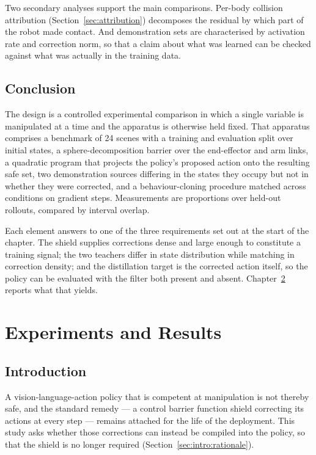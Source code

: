 \documentclass[a4paper,11pt]{report}
\begin{document}
Two secondary analyses support the main comparisons. Per-body collision attribution
(Section~\ref{sec:attribution}) decomposes the residual by which part of the robot made contact.
And demonstration sets are characterised by activation rate and correction norm, so that a claim
about what was learned can be checked against what was actually in the training data.

\section{Conclusion}\label{sec:method:conclusion}

The design is a controlled experimental comparison in which a single variable is manipulated at a
time and the apparatus is otherwise held fixed. That apparatus comprises a benchmark of 24 scenes
with a training and evaluation split over initial states, a sphere-decomposition barrier over the
end-effector and arm links, a quadratic program that projects the policy's proposed action onto the
resulting safe set, two demonstration sources differing in the states they occupy but not in
whether they were corrected, and a behaviour-cloning procedure matched across conditions on
gradient steps. Measurements are proportions over held-out rollouts, compared by interval overlap.

Each element answers to one of the three requirements set out at the start of the chapter. The
shield supplies corrections dense and large enough to constitute a training signal; the two
teachers differ in state distribution while matching in correction density; and the distillation
target is the corrected action itself, so the policy can be evaluated with the filter both present
and absent. Chapter~\ref{ch:results} reports what that yields.



\chapter{Experiments and Results}\label{ch:results}

\section{Introduction}\label{sec:res:intro}

A vision-language-action policy that is competent at manipulation is not thereby safe, and the
standard remedy --- a control barrier function shield correcting its actions at every step ---
remains attached for the life of the deployment. This study asks whether those corrections can
instead be compiled into the policy, so that the shield is no longer required
(Section~\ref{sec:intro:rationale}).
\end{document}
